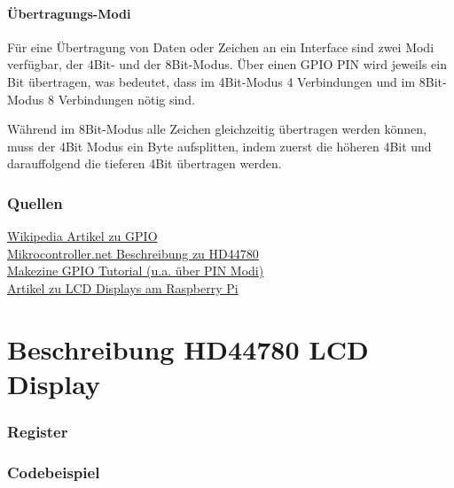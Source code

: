 \documentclass[a4paper,11pt]{article}
\begin{document}
\subsection{Übertragungs-Modi}
Für eine Übertragung von Daten oder Zeichen an ein Interface sind zwei Modi verfügbar, der 4Bit- und der 8Bit-Modus. Über einen GPIO PIN wird jeweils ein Bit übertragen, was bedeutet, dass im 4Bit-Modus 4 Verbindungen und im 8Bit-Modus 8 Verbindungen nötig sind.\par
Während im 8Bit-Modus alle Zeichen gleichzeitig übertragen werden können, muss der 4Bit Modus ein Byte aufsplitten, indem zuerst die höheren 4Bit und darauffolgend die tieferen 4Bit übertragen werden.

\section*{Quellen}
\href{https://en.wikipedia.org/wiki/General-purpose_input/output}{Wikipedia Artikel zu GPIO}\\
\href{http://www.mikrocontroller.net/articles/HD44780}{Mikrocontroller.net Beschreibung zu HD44780}\\
\href{http://makezine.com/projects/tutorial-raspberry-pi-gpio-pins-and-python/}{Makezine GPIO Tutorial (u.a. über PIN Modi)}\\
\href{https://projects.drogon.net/raspberry-pi/gpio-examples/lcd-interface/}{Artikel zu LCD Displays am Raspberry Pi}

\part{Beschreibung HD44780 LCD Display}
\section{Register}

\section{Codebeispiel}
\end{document}
